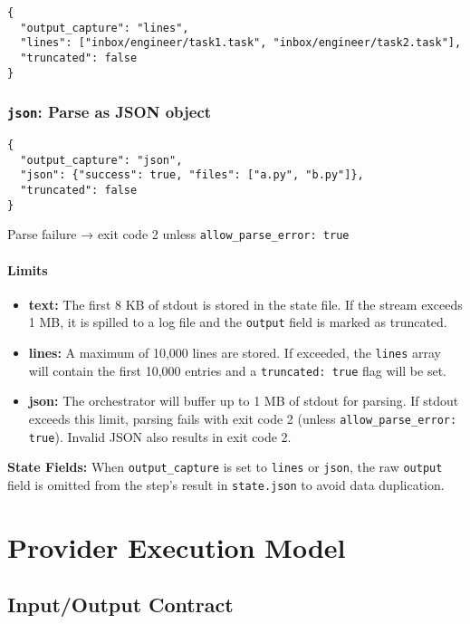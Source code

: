 \documentclass[11pt,a4paper]{article}
\begin{document}
\begin{lstlisting}[caption={Lines Output Capture}]
{
  "output_capture": "lines",
  "lines": ["inbox/engineer/task1.task", "inbox/engineer/task2.task"],
  "truncated": false
}
\end{lstlisting}

\subsubsection{\texttt{json}: Parse as JSON object}

\begin{lstlisting}[caption={JSON Output Capture}]
{
  "output_capture": "json",
  "json": {"success": true, "files": ["a.py", "b.py"]},
  "truncated": false
}
\end{lstlisting}

Parse failure → exit code 2 unless \texttt{allow\_parse\_error: true}

\paragraph{Limits}
\begin{itemize}
    \item \textbf{text:} The first 8 KB of stdout is stored in the state file. If the stream exceeds 1 MB, it is spilled to a log file and the \texttt{output} field is marked as truncated.
    \item \textbf{lines:} A maximum of 10,000 lines are stored. If exceeded, the \texttt{lines} array will contain the first 10,000 entries and a \texttt{truncated: true} flag will be set.
    \item \textbf{json:} The orchestrator will buffer up to 1 MB of stdout for parsing. If stdout exceeds this limit, parsing fails with exit code 2 (unless \texttt{allow\_parse\_error: true}). Invalid JSON also results in exit code 2.
\end{itemize}

\textbf{State Fields:} When \texttt{output\_capture} is set to \texttt{lines} or \texttt{json}, the raw \texttt{output} field is omitted from the step's result in \texttt{state.json} to avoid data duplication.

\section{Provider Execution Model}

\subsection{Input/Output Contract}
\end{document}
